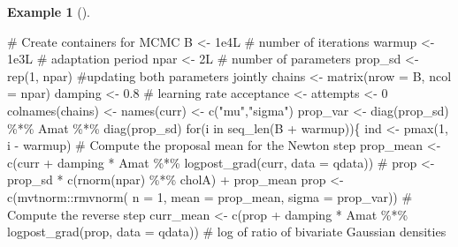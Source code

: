 \documentclass[
  11pt,
  letterpaper,
]{scrbook}
\newenvironment{Shaded}{\begin{snugshade}}{\end{snugshade}}
\newcommand{\AttributeTok}[1]{\textcolor[rgb]{0.40,0.45,0.13}{#1}}
\newcommand{\CommentTok}[1]{\textcolor[rgb]{0.37,0.37,0.37}{#1}}
\newcommand{\ControlFlowTok}[1]{\textcolor[rgb]{0.00,0.23,0.31}{#1}}
\newcommand{\DecValTok}[1]{\textcolor[rgb]{0.68,0.00,0.00}{#1}}
\newcommand{\FloatTok}[1]{\textcolor[rgb]{0.68,0.00,0.00}{#1}}
\newcommand{\FunctionTok}[1]{\textcolor[rgb]{0.28,0.35,0.67}{#1}}
\newcommand{\NormalTok}[1]{\textcolor[rgb]{0.00,0.23,0.31}{#1}}
\newcommand{\OtherTok}[1]{\textcolor[rgb]{0.00,0.23,0.31}{#1}}
\newcommand{\SpecialCharTok}[1]{\textcolor[rgb]{0.37,0.37,0.37}{#1}}
\newcommand{\StringTok}[1]{\textcolor[rgb]{0.13,0.47,0.30}{#1}}
\theoremstyle{definition}
\newtheorem{example}{Example}[chapter]
\theoremstyle{definition}
\theoremstyle{definition}
\theoremstyle{plain}
\theoremstyle{remark}
\begin{document}
\begin{example}[]
\begin{Shaded}
\begin{Highlighting}[]
\CommentTok{\# Create containers for MCMC}
\NormalTok{B }\OtherTok{\textless{}{-}} \FloatTok{1e4}\NormalTok{L }\CommentTok{\# number of iterations}
\NormalTok{warmup }\OtherTok{\textless{}{-}} \FloatTok{1e3}\NormalTok{L }\CommentTok{\# adaptation period}
\NormalTok{npar }\OtherTok{\textless{}{-}}\NormalTok{ 2L }\CommentTok{\# number of parameters}
\NormalTok{prop\_sd }\OtherTok{\textless{}{-}} \FunctionTok{rep}\NormalTok{(}\DecValTok{1}\NormalTok{, npar) }\CommentTok{\#updating both parameters jointly}
\NormalTok{chains }\OtherTok{\textless{}{-}} \FunctionTok{matrix}\NormalTok{(}\AttributeTok{nrow =}\NormalTok{ B, }\AttributeTok{ncol =}\NormalTok{ npar)}
\NormalTok{damping }\OtherTok{\textless{}{-}} \FloatTok{0.8} \CommentTok{\# learning rate}
\NormalTok{acceptance }\OtherTok{\textless{}{-}}\NormalTok{ attempts }\OtherTok{\textless{}{-}} \DecValTok{0} 
\FunctionTok{colnames}\NormalTok{(chains) }\OtherTok{\textless{}{-}} \FunctionTok{names}\NormalTok{(curr) }\OtherTok{\textless{}{-}} \FunctionTok{c}\NormalTok{(}\StringTok{"mu"}\NormalTok{,}\StringTok{"sigma"}\NormalTok{)}
\NormalTok{prop\_var }\OtherTok{\textless{}{-}} \FunctionTok{diag}\NormalTok{(prop\_sd) }\SpecialCharTok{\%*\%}\NormalTok{ Amat }\SpecialCharTok{\%*\%} \FunctionTok{diag}\NormalTok{(prop\_sd)}
\ControlFlowTok{for}\NormalTok{(i }\ControlFlowTok{in} \FunctionTok{seq\_len}\NormalTok{(B }\SpecialCharTok{+}\NormalTok{ warmup))\{}
\NormalTok{  ind }\OtherTok{\textless{}{-}} \FunctionTok{pmax}\NormalTok{(}\DecValTok{1}\NormalTok{, i }\SpecialCharTok{{-}}\NormalTok{ warmup)}
  \CommentTok{\# Compute the proposal mean for the Newton step}
\NormalTok{  prop\_mean }\OtherTok{\textless{}{-}} \FunctionTok{c}\NormalTok{(curr }\SpecialCharTok{+}\NormalTok{ damping }\SpecialCharTok{*} 
\NormalTok{     Amat }\SpecialCharTok{\%*\%} \FunctionTok{logpost\_grad}\NormalTok{(curr, }\AttributeTok{data =}\NormalTok{ qdata))}
  \CommentTok{\# prop \textless{}{-} prop\_sd * c(rnorm(npar) \%*\% cholA) + prop\_mean}
\NormalTok{  prop }\OtherTok{\textless{}{-}} \FunctionTok{c}\NormalTok{(mvtnorm}\SpecialCharTok{::}\FunctionTok{rmvnorm}\NormalTok{(}
    \AttributeTok{n =} \DecValTok{1}\NormalTok{,}
    \AttributeTok{mean =}\NormalTok{ prop\_mean, }
    \AttributeTok{sigma =}\NormalTok{ prop\_var))}
  \CommentTok{\# Compute the reverse step}
\NormalTok{  curr\_mean }\OtherTok{\textless{}{-}} \FunctionTok{c}\NormalTok{(prop }\SpecialCharTok{+}\NormalTok{ damping }\SpecialCharTok{*} 
\NormalTok{     Amat }\SpecialCharTok{\%*\%} \FunctionTok{logpost\_grad}\NormalTok{(prop, }\AttributeTok{data =}\NormalTok{ qdata))}
  \CommentTok{\# log of ratio of bivariate Gaussian densities}

\end{Highlighting}
\end{Shaded}
\end{example}
\end{document}
